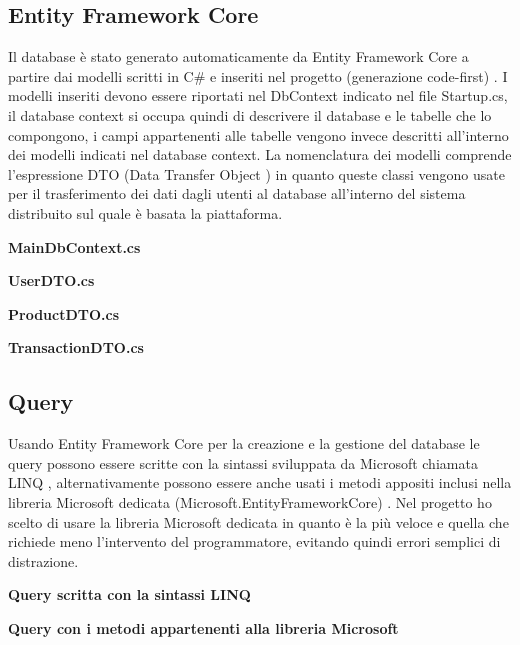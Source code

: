 \subsection{Entity Framework Core}
Il database è stato generato automaticamente da Entity Framework Core a partire dai modelli scritti in C\# e inseriti nel progetto (generazione code-first) \cite{EFcore}. I modelli inseriti devono essere riportati nel DbContext indicato nel file Startup.cs, il database context si occupa quindi di descrivere il database e le tabelle che lo compongono, i campi appartenenti alle tabelle vengono invece descritti all'interno dei modelli indicati nel database context. La nomenclatura dei modelli comprende l'espressione DTO (Data Transfer Object \cite{DTO}) in quanto queste classi vengono usate per il trasferimento dei dati dagli utenti al database all'interno del sistema distribuito sul quale è basata la piattaforma. 
\bigskip

\textbf{MainDbContext.cs}

\bigskip

\textbf{UserDTO.cs}

\bigskip

\textbf{ProductDTO.cs}

\bigskip

\textbf{TransactionDTO.cs}


\subsection{Query}
Usando Entity Framework Core per la creazione e la gestione del database le query possono essere scritte con la sintassi sviluppata da Microsoft chiamata LINQ \cite{LINQ}, alternativamente possono essere anche usati i metodi appositi inclusi nella libreria Microsoft dedicata (Microsoft.EntityFrameworkCore) \cite{Microsoft.EFcore}. Nel progetto ho scelto di usare la libreria Microsoft dedicata in quanto è la più veloce e quella che richiede meno l'intervento del programmatore, evitando quindi errori semplici di distrazione. 
\bigskip

\textbf{Query scritta con la sintassi LINQ}

\bigskip

\textbf{Query con i metodi appartenenti alla libreria Microsoft}

